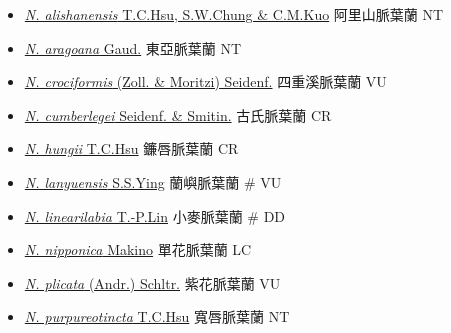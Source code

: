 \begin{itemize}
  \begin{itemize}
        \item[] \href{http://www.theplantlist.org/tpl1.1/search?q=Nervilia+alishanensis}{\textit{N. alishanensis} T.C.Hsu, S.W.Chung \& C.M.Kuo}   阿里山脈葉蘭   NT
        \item[] \href{http://www.theplantlist.org/tpl1.1/search?q=Nervilia+aragoana}{\textit{N. aragoana} Gaud.}   東亞脈葉蘭   NT
        \item[] \href{http://www.theplantlist.org/tpl1.1/search?q=Nervilia+crociformis}{\textit{N. crociformis} (Zoll. \& Moritzi) Seidenf.}   四重溪脈葉蘭   VU
        \item[] \href{http://www.theplantlist.org/tpl1.1/search?q=Nervilia+cumberlegei}{\textit{N. cumberlegei} Seidenf. \& Smitin.}   古氏脈葉蘭   CR
        \item[] \href{http://www.theplantlist.org/tpl1.1/search?q=Nervilia+hungii}{\textit{N. hungii} T.C.Hsu}   鐮唇脈葉蘭   CR
        \item[] \href{http://www.theplantlist.org/tpl1.1/search?q=Nervilia+lanyuensis}{\textit{N. lanyuensis} S.S.Ying}   蘭嶼脈葉蘭  \# VU
        \item[] \href{http://www.theplantlist.org/tpl1.1/search?q=Nervilia+linearilabia}{\textit{N. linearilabia} T.-P.Lin}   小麥脈葉蘭  \# DD
        \item[] \href{http://www.theplantlist.org/tpl1.1/search?q=Nervilia+nipponica}{\textit{N. nipponica} Makino}   單花脈葉蘭   LC
        \item[] \href{http://www.theplantlist.org/tpl1.1/search?q=Nervilia+plicata}{\textit{N. plicata} (Andr.) Schltr.}   紫花脈葉蘭   VU
        \item[] \href{http://www.theplantlist.org/tpl1.1/search?q=Nervilia+purpureotincta}{\textit{N. purpureotincta} T.C.Hsu}   寬唇脈葉蘭   NT

\end{itemize}
\end{itemize}
